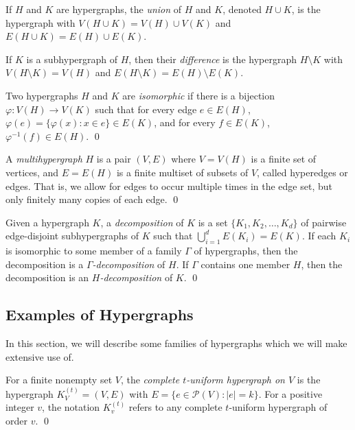 If $H$ and $K$ are hypergraphs, the {\em union} of $H$ and $K$, denoted
$H \cup K$, is the hypergraph with $V(H \cup K) = V(H) \cup V(K)$ and
$E(H \cup K) = E(H) \cup E(K)$.

If $K$ is a subhypergraph of $H$, then their {\em difference}
is the hypergraph $H \setminus K$ with $V(H \setminus K) = V(H)$ and
$E(H \setminus K) = E(H) \setminus E(K)$.

\begin{definition}
Two hypergraphs $H$ and $K$ are {\em isomorphic} if there is a bijection
$\varphi : V(H) \to V(K)$ such that for every edge $e \in E(H)$,
$\varphi(e) = \{\varphi(x) : x \in e\} \in E(K)$, and for every
$f \in E(K)$, $\varphi^{-1}(f) \in E(H)$.
\qed
\end{definition}

\begin{definition}
A {\em multihypergraph} $H$ is a pair $(V, E)$ where $V = V(H)$ is a finite set
of vertices, and $E = E(H)$ is a finite multiset of subsets of $V$, called
hyperedges or edges. That is, we allow for edges to occur multiple times in the
edge set, but only finitely many copies of each edge.
\qed
\end{definition}

\begin{definition}
Given a hypergraph $K$, a {\em decomposition} of $K$ is a set $\{K_1,
K_2, \ldots, K_d\}$ of pairwise edge-disjoint subhypergraphs of $K$ such that
$\bigcup_{i=1}^d E(K_i) = E(K)$. If each $K_i$ is isomorphic to some member
of a family $\Gamma$ of hypergraphs, then the decomposition is a {\em
$\Gamma$-decomposition} of $H$. If $\Gamma$ contains one member $H$, then the
decomposition is an {\em $H$-decomposition} of $K$.
\qed
\end{definition}

\subsection{Examples of Hypergraphs}

In this section, we will describe some families of hypergraphs which we will
make extensive use of.

\begin{definition}
For a finite nonempty set $V$, the {\em complete $t$-uniform hypergraph on $V$}
is the hypergraph $K_V^{(t)} = (V, E)$ with $E = \{e \in \mathcal{P}(V) : |e| = k\}$.
For a positive integer $v$, the notation $K_v^{(t)}$ refers to any complete
$t$-uniform hypergraph of order $v$.
\qed
\end{definition}


